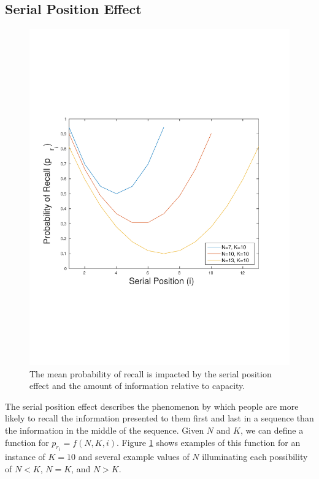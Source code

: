 \subsection{Serial Position Effect}
\label{sec:ser_pos_effect}

\begin{figure}
\begin{centering}
    \includegraphics[clip=true, trim = 0mm 65mm 25mm 50mm, scale=0.50]{figures/mean_prob_recall_vs_ser_pos.pdf}
    \caption{ The mean probability of recall is impacted by the serial position effect and the amount of information relative to capacity. }
    \label{fig:prob_recall_vs_serial_pos}
\end{centering}
\end{figure}

The serial position effect describes the phenomenon by which people are more likely to recall the information presented to them first and last in a sequence than the information in the middle of the sequence.  Given $N$ and $K$, we can define a function for $p_{r_i} = f(N,K,i)$.  Figure \ref{fig:prob_recall_vs_serial_pos} shows examples of this function for an instance of $K=10$ and several example values of $N$ illuminating each possibility of $N < K$, $N = K$, and $N > K$.

